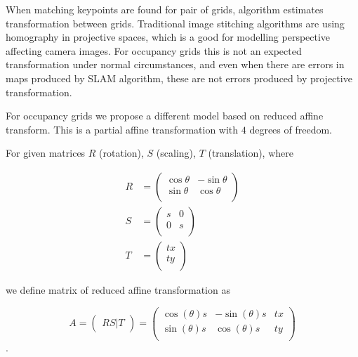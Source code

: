 When matching keypoints are found for pair of grids, algorithm estimates transformation between grids. Traditional image stitching algorithms are using homography in projective spaces, which is a good for modelling perspective affecting camera images. For occupancy grids this is not an expected transformation under normal circumstances, and even when there are errors in maps produced by \gls{SLAM} algorithm, these are not errors produced by projective transformation.

For occupancy grids we propose a different model based on reduced affine transform. This is a partial affine transformation with $4$ degrees of freedom.

\begin{defn}
For given matrices $R$ (rotation), $S$ (scaling), $T$ (translation), where

\begin{align}
    R &=
    \begin{pmatrix}
        \cos{\theta} & -\sin{\theta} \\
        \sin{\theta} & \cos{\theta} \\
    \end{pmatrix} \\
    S &=
    \begin{pmatrix}
        s & 0 \\
        0 & s \\
    \end{pmatrix} \\
    T &=
    \begin{pmatrix}
        tx \\
        ty \\
    \end{pmatrix}
\end{align}

we define matrix of reduced affine transformation as

\begin{equation}
    A =
    \begin{pmatrix}
        RS|T
    \end{pmatrix}
    =
    \begin{pmatrix}
        \cos(\theta)s & -\sin(\theta)s & tx \\
        \sin(\theta)s & \cos(\theta)s & ty \\
    \end{pmatrix}
\end{equation}.
\end{defn}

